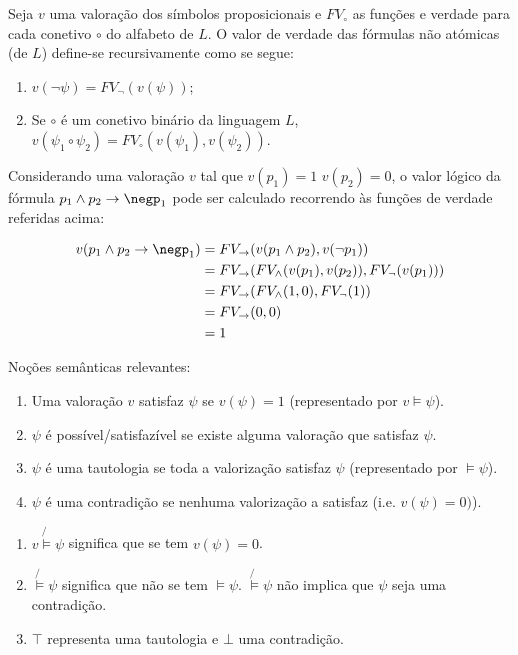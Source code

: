 Seja $v$ uma valoração dos símbolos proposicionais e $FV_\circ$ as funções e verdade para cada conetivo $\circ$ do alfabeto de $L$. O valor de verdade das fórmulas não atómicas (de $L$) define-se recursivamente como se segue:

\begin{enumerate}[label=(\roman*)]
    \item $v(\neg\psi)=FV_\neg(v(\psi))$;
    \item Se $\circ$ é um conetivo binário da linguagem $L$, $v(\psi_1 \circ \psi_2)=FV_\circ(v(\psi_1),v(\psi_2))$.
\end{enumerate}

Considerando uma valoração $v$ tal que $v(p_1)=1$ $v(p_2)=0$, o valor lógico da fórmula $p_1\land p_2 \to \negp_1$ pode ser calculado recorrendo às funções de verdade referidas acima:

\begin{align*}
    v(p_1\land p_2 \to \negp_1)& =FV_{\to}(v(p_1\land p_2),v(\neg p_1)) \\
    & =FV_{\to}(FV_\land(v(p_1), v(p_2)), FV_\neg(v(p_1)))\\
    & =FV_{\to}(FV_\land(1,0),FV_\neg(1)) \\
    & =FV_{\to}(0,0) \\
    & =1
\end{align*}

\begin{definition}
    Noções semânticas relevantes:
    \begin{enumerate}[label=(\alph*)]
        \item Uma valoração $v$ satisfaz $\psi$ se $v(\psi)=1$ (representado por $v \models \psi$).
        \item $\psi$ é possível/satisfazível se existe alguma valoração que satisfaz $\psi$.
        \item $\psi$ é uma tautologia se toda a valorização satisfaz $\psi$ (representado por $\models \psi$).
        \item $\psi$ é uma contradição se nenhuma valorização a satisfaz (i.e. $v(\psi)=0)$).
    \end{enumerate}
\end{definition}

\begin{enumerate}[label=\arabic*.] \\
    \item $v \not{\models} \psi$ significa que se tem $v(\psi)=0$.
    \item $\not{\models} \psi$ significa que não se tem $\models \psi$. $\not{\models} \psi$ não implica que $\psi$ seja uma contradição.
    \item $\top$ representa uma tautologia e $\bot$ uma contradição.
\end{enumerate}

